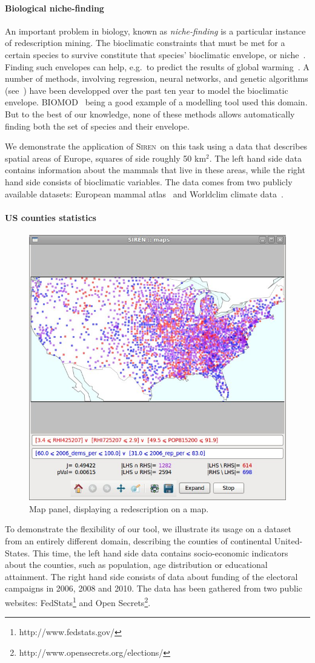 \documentclass{sig-alternate}
\newcommand{\prg}[1]{\paragraph{#1}}
\newcommand{\Siren}{\textsc{Siren}}
\begin{document}
\prg{Biological niche-finding}
An important problem in biology, known as \emph{niche-finding} is a
particular instance of redescription mining.  The bioclimatic
constraints that must be met for a certain species to survive
constitute that species' bioclimatic envelope, or niche~\cite{grinnell17niche}.  Finding such
envelopes can help, e.g.\ to predict the results of global
warming~\cite{pearson03predicting}.  A number of methods, involving
regression, neural networks, and genetic algorithms
(see~\cite{soberon05interpretation}) have been developped over the
past ten year to model the bioclimatic envelope.
\textsc{BIOMOD}~\cite{thuiller09biomod} being a good example of
a modelling tool used this domain.  But to the best of our
knowledge, none of these methods allows automatically finding both the
set of species and their envelope.

We demonstrate the application of \Siren\ on this task using a data
that describes spatial areas of Europe, squares of side roughly 50
km$^2$.  The left hand side data contains information about the
mammals that live in these areas, while the right hand side consists
of bioclimatic variables. The data comes from two publicly available
datasets: European mammal atlas~\cite{mitchell-jones99atlas} and
Worldclim climate data~\cite{hijmans05very}.

\prg{US counties statistics}

\begin{figure}
  \centering
\includegraphics[width=.5\textwidth]{screenshots/siren_map_us_00.jpg}
  \caption{Map panel, displaying a redescription on a map.}
  \label{fig:map_panel}
\end{figure}


To demonstrate the flexibility of our tool, we illustrate its usage on a dataset from an entirely different domain, describing the counties of continental United-States. 
This time, the left hand side data contains socio-economic indicators about the counties, such as population, age distribution or educational attainment. The right hand side consists of data about funding of the electoral campaigns in 2006, 2008 and 2010. The data has been gathered from two public websites: FedStats\footnote{http://www.fedstats.gov/} and Open Secrets\footnote{http://www.opensecrets.org/elections/}.
\end{document}
